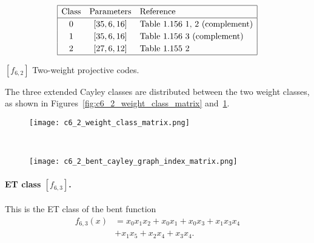 \begin{table}[!bhpt] %
\small{
\begin{align*}
\def\arraystretch{1.2}
\begin{array}{|ccl|}
\hline
\text{Class} &
\text{Parameters} & \text{Reference}
\\
\hline
0 & [35,6,16] & \text{Table 1.156 1, 2 (complement)}
\\
1 & [35,6,16] & \text{Table 1.156 3 (complement)}
\\
2 & [27,6,12] & \text{Table 1.155 2 }
\\
\hline
\end{array}
\end{align*}
}
\caption{$[f_{6,2}]$ Two-weight projective codes.}
\label{tab-c6_2_codes}
\end{table}

The three extended Cayley classes are distributed between the two weight classes,
as shown in Figures~\ref{fig:c6_2_weight_class_matrix} and~\ref{fig:c6_2_bent_cayley_graph_index_matrix}.

\begin{figure}[!bhpt] %
\centering
\begin{minipage}{.48\textwidth}
  \centering
  \texttt{[image: c6\_2\_weight\_class\_matrix.png]}
  \label{fig:c6_2_weight_class_matrix}
\end{minipage}%
~~~~
\begin{minipage}{.48\textwidth}
  \centering
  \texttt{[image: c6\_2\_bent\_cayley\_graph\_index\_matrix.png]}
  \label{fig:c6_2_bent_cayley_graph_index_matrix}
\end{minipage}
\end{figure}

%
\paragraph*{ET class $[f_{6,3}]$.}
%
This is the ET class of the bent function
\begin{align*}
f_{6,3}(x) &= x_{0} x_{1} x_{2} + x_{0} x_{1} + x_{0} x_{3} + x_{1} x_{3} x_{4}
\\
           &+ x_{1} x_{5} + x_{2} x_{4} + x_{3} x_{4}.
\end{align*}

